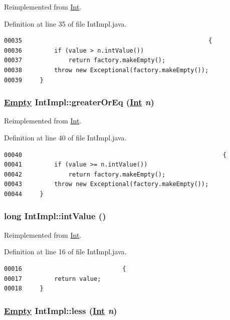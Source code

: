Reimplemented from \hyperlink{interfaceInt_a5}{Int}.

Definition at line 35 of file Int\-Impl.java.\footnotesize\begin{verbatim}00035                                                    {
00036         if (value > n.intValue())
00037             return factory.makeEmpty();
00038         throw new Exceptional(factory.makeEmpty());
00039     }
\end{verbatim}\normalsize 
\hypertarget{classIntImpl_a6}{
\subsubsection[greaterOrEq]{\setlength{\rightskip}{0pt plus 5cm}\hyperlink{interfaceEmpty}{Empty} Int\-Impl::greater\-Or\-Eq (\hyperlink{interfaceInt}{Int} {\em n})}}
\label{classIntImpl_a6}




Reimplemented from \hyperlink{interfaceInt_a6}{Int}.

Definition at line 40 of file Int\-Impl.java.\footnotesize\begin{verbatim}00040                                                        {
00041         if (value >= n.intValue())
00042             return factory.makeEmpty();
00043         throw new Exceptional(factory.makeEmpty());
00044     }
\end{verbatim}\normalsize 
\hypertarget{classIntImpl_a0}{
\subsubsection[intValue]{\setlength{\rightskip}{0pt plus 5cm}long Int\-Impl::int\-Value ()}}
\label{classIntImpl_a0}




Reimplemented from \hyperlink{interfaceInt_a0}{Int}.

Definition at line 16 of file Int\-Impl.java.\footnotesize\begin{verbatim}00016                            {
00017         return value;
00018     }
\end{verbatim}\normalsize 
\hypertarget{classIntImpl_a7}{
\subsubsection[less]{\setlength{\rightskip}{0pt plus 5cm}\hyperlink{interfaceEmpty}{Empty} Int\-Impl::less (\hyperlink{interfaceInt}{Int} {\em n})}}
\label{classIntImpl_a7}




